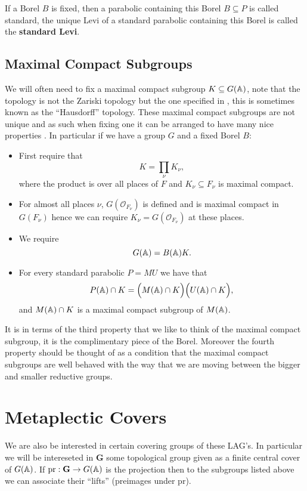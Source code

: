     If a Borel \(B\) is fixed, then a parabolic containing this Borel \(B\subseteq P\) is called standard, the unique Levi of a standard parabolic containing this Borel is called the \textbf{standard Levi}.

    \subsection{Maximal Compact Subgroups}\label{max_compact_subgroup}
    We will often need to fix a maximal compact subgroup \(K\subseteq G(\A)\), note that the topology is not the Zariski topology but the one specified in \cite{conradWeilGrothendieckApproaches2012}, this is sometimes known as the ``Hausdorff'' topology. These maximal compact subgroups are not unique and as such when fixing one it can be arranged to have many nice properties \cite[I.1.4]{moeglinSpectralDecompositionEisenstein1995}. In particular if we have a group \(G\) and a fixed Borel \(B\):
    \begin{itemize}
        \item First require that 
        \[K = \prod_\nu K_\nu,\]
        where the product is over all places of \(F\) and \(K_\nu\subseteq F_\nu\) is maximal compact.
        \item For almost all places \(\nu\), \(G(\mathcal{O}_{F_\nu})\) is defined and is maximal compact in \(G(F_\nu)\) hence we can require \(K_\nu = G(\mathcal{O}_{F_\nu})\) at these places. 
        \item We require 
        \[G(\A) = B(\A)K.\]
        \item For every standard parabolic \(P = MU\) we have that 
        \[P(\A)\cap K = \Bigl( M(\A)\cap K \Bigr) \Bigl( U(\A)\cap K \Bigr),\]
        and \(M(\A)\cap K\) is a maximal compact subgroup of \(M(\A)\).
    \end{itemize}
     It is in terms of the third property that we like to think of the maximal compact subgroup, it is the complimentary piece of the Borel. Moreover the fourth property should be thought of as a condition that the maximal compact subgroups are well behaved with the way that we are moving between the bigger and smaller reductive groups.
    

    \section{Metaplectic Covers}
    We are also be interested in certain covering groups of these LAG's. In particular \cite[I.1.1]{moeglinSpectralDecompositionEisenstein1995} we will be intereseted in \(\mathbf{G}\) some topological group given as a finite central cover of \(G(\A)\). If \(\mathrm{pr}: \mathbf{G} \to G(\A)\) is the projection then to the subgroups listed above we can associate their ``lifts'' (preimages under \(\mathrm{pr}\)). 

